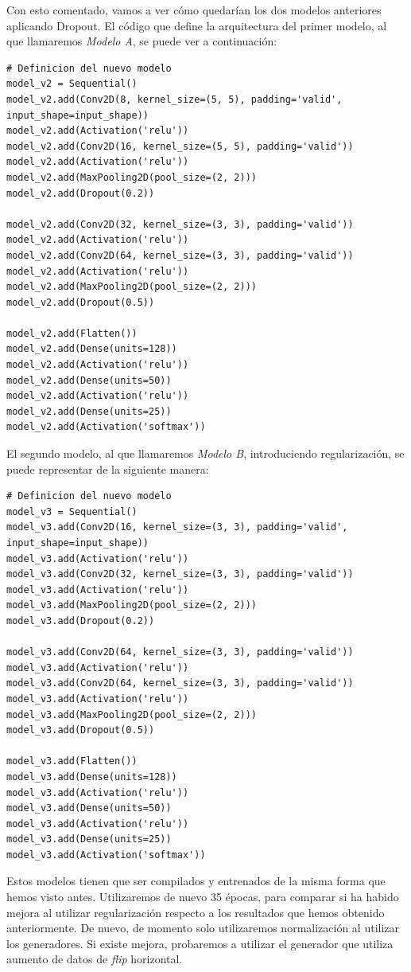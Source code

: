 \documentclass[11pt,a4paper]{article}
\begin{document}
Con esto comentado, vamos a ver cómo quedarían los dos modelos anteriores aplicando Dropout. El código que define
la arquitectura del primer modelo, al que llamaremos \textit{Modelo A}, se puede ver a continuación:

\begin{lstlisting}
# Definicion del nuevo modelo
model_v2 = Sequential()
model_v2.add(Conv2D(8, kernel_size=(5, 5), padding='valid', input_shape=input_shape))
model_v2.add(Activation('relu'))
model_v2.add(Conv2D(16, kernel_size=(5, 5), padding='valid'))
model_v2.add(Activation('relu'))
model_v2.add(MaxPooling2D(pool_size=(2, 2)))
model_v2.add(Dropout(0.2))

model_v2.add(Conv2D(32, kernel_size=(3, 3), padding='valid'))
model_v2.add(Activation('relu'))
model_v2.add(Conv2D(64, kernel_size=(3, 3), padding='valid'))
model_v2.add(Activation('relu'))
model_v2.add(MaxPooling2D(pool_size=(2, 2)))
model_v2.add(Dropout(0.5))

model_v2.add(Flatten())
model_v2.add(Dense(units=128))
model_v2.add(Activation('relu'))
model_v2.add(Dense(units=50))
model_v2.add(Activation('relu'))
model_v2.add(Dense(units=25))
model_v2.add(Activation('softmax'))
\end{lstlisting}

El segundo modelo, al que llamaremos \textit{Modelo B}, introduciendo regularización, se puede representar de la siguiente manera:

\begin{lstlisting}
# Definicion del nuevo modelo
model_v3 = Sequential()
model_v3.add(Conv2D(16, kernel_size=(3, 3), padding='valid', input_shape=input_shape))
model_v3.add(Activation('relu'))
model_v3.add(Conv2D(32, kernel_size=(3, 3), padding='valid'))
model_v3.add(Activation('relu'))
model_v3.add(MaxPooling2D(pool_size=(2, 2)))
model_v3.add(Dropout(0.2))

model_v3.add(Conv2D(64, kernel_size=(3, 3), padding='valid'))
model_v3.add(Activation('relu'))
model_v3.add(Conv2D(64, kernel_size=(3, 3), padding='valid'))
model_v3.add(Activation('relu'))
model_v3.add(MaxPooling2D(pool_size=(2, 2)))
model_v3.add(Dropout(0.5))

model_v3.add(Flatten())
model_v3.add(Dense(units=128))
model_v3.add(Activation('relu'))
model_v3.add(Dense(units=50))
model_v3.add(Activation('relu'))
model_v3.add(Dense(units=25))
model_v3.add(Activation('softmax'))
\end{lstlisting}

Estos modelos tienen que ser compilados y entrenados de la misma forma que hemos visto antes. Utilizaremos de nuevo 35 épocas,
para comparar si ha habido mejora al utilizar regularización respecto a los resultados que hemos obtenido anteriormente. De nuevo,
de momento solo utilizaremos normalización al utilizar los generadores. Si existe mejora, probaremos a utilizar el generador
que utiliza aumento de datos de \textit{flip} horizontal.
\end{document}
